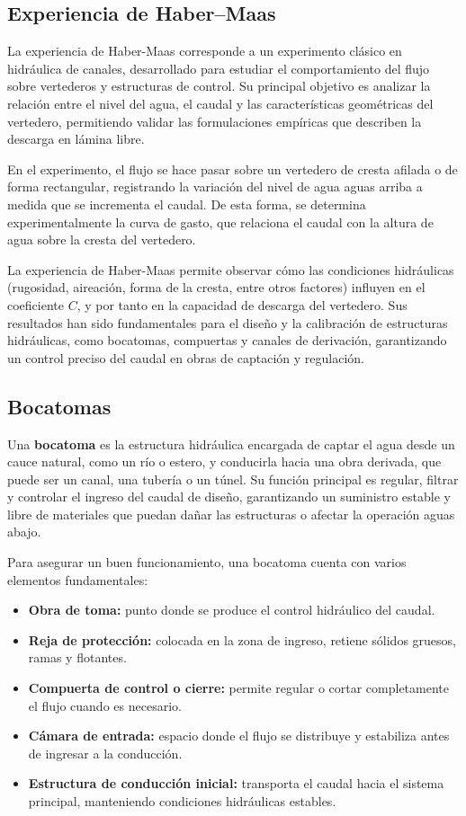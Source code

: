 \documentclass{article} %
\begin{document}
\subsection{Experiencia de Haber--Maas}

La experiencia de Haber-Maas corresponde a un experimento clásico en hidráulica de canales, desarrollado para estudiar el comportamiento del flujo sobre vertederos y estructuras de control. Su principal objetivo es analizar la relación entre el nivel del agua, el caudal y las características geométricas del vertedero, permitiendo validar las formulaciones empíricas que describen la descarga en lámina libre.

En el experimento, el flujo se hace pasar sobre un vertedero de cresta afilada o de forma rectangular, registrando la variación del nivel de agua aguas arriba a medida que se incrementa el caudal. De esta forma, se determina experimentalmente la curva de gasto, que relaciona el caudal con la altura de agua sobre la cresta del vertedero.

La experiencia de Haber-Maas permite observar cómo las condiciones hidráulicas (rugosidad, aireación, forma de la cresta, entre otros factores) influyen en el coeficiente $C$, y por tanto en la capacidad de descarga del vertedero. Sus resultados han sido fundamentales para el diseño y la calibración de estructuras hidráulicas, como bocatomas, compuertas y canales de derivación, garantizando un control preciso del caudal en obras de captación y regulación.

\subsection{Bocatomas}

Una \textbf{bocatoma} es la estructura hidráulica encargada de captar el agua desde un cauce natural, como un río o estero, y conducirla hacia una obra derivada, que puede ser un canal, una tubería o un túnel. Su función principal es regular, filtrar y controlar el ingreso del caudal de diseño, garantizando un suministro estable y libre de materiales que puedan dañar las estructuras o afectar la operación aguas abajo.

Para asegurar un buen funcionamiento, una bocatoma cuenta con varios elementos fundamentales:

\begin{itemize}
    \item \textbf{Obra de toma:} punto donde se produce el control hidráulico del caudal.
    \item \textbf{Reja de protección:} colocada en la zona de ingreso, retiene sólidos gruesos, ramas y flotantes.
    \item \textbf{Compuerta de control o cierre:} permite regular o cortar completamente el flujo cuando es necesario.
    \item \textbf{Cámara de entrada:} espacio donde el flujo se distribuye y estabiliza antes de ingresar a la conducción.
    \item \textbf{Estructura de conducción inicial:} transporta el caudal hacia el sistema principal, manteniendo condiciones hidráulicas estables.
\end{itemize}
\end{document}
